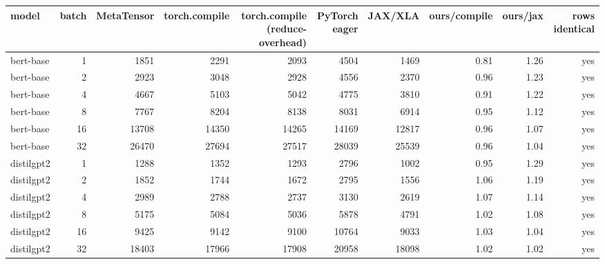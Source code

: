\begin{tabular}{lrrrrrrrrr}
\toprule
model & batch & MetaTensor & torch.compile & torch.compile (reduce-overhead) & PyTorch eager & JAX/XLA & ours/compile & ours/jax & rows identical \\
\midrule
bert-base & 1 & 1851 & 2291 & 2093 & 4504 & 1469 & 0.81 & 1.26 & yes \\
bert-base & 2 & 2923 & 3048 & 2928 & 4556 & 2370 & 0.96 & 1.23 & yes \\
bert-base & 4 & 4667 & 5103 & 5042 & 4775 & 3810 & 0.91 & 1.22 & yes \\
bert-base & 8 & 7767 & 8204 & 8138 & 8031 & 6914 & 0.95 & 1.12 & yes \\
bert-base & 16 & 13708 & 14350 & 14265 & 14169 & 12817 & 0.96 & 1.07 & yes \\
bert-base & 32 & 26470 & 27694 & 27517 & 28039 & 25539 & 0.96 & 1.04 & yes \\
distilgpt2 & 1 & 1288 & 1352 & 1293 & 2796 & 1002 & 0.95 & 1.29 & yes \\
distilgpt2 & 2 & 1852 & 1744 & 1672 & 2795 & 1556 & 1.06 & 1.19 & yes \\
distilgpt2 & 4 & 2989 & 2788 & 2737 & 3130 & 2619 & 1.07 & 1.14 & yes \\
distilgpt2 & 8 & 5175 & 5084 & 5036 & 5878 & 4791 & 1.02 & 1.08 & yes \\
distilgpt2 & 16 & 9425 & 9142 & 9100 & 10764 & 9033 & 1.03 & 1.04 & yes \\
distilgpt2 & 32 & 18403 & 17966 & 17908 & 20958 & 18098 & 1.02 & 1.02 & yes \\
\bottomrule
\end{tabular}
